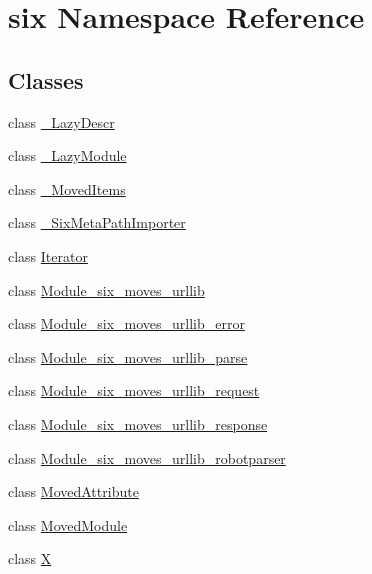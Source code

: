 \hypertarget{namespacesix}{}\section{six Namespace Reference}
\label{namespacesix}
\subsection*{Classes}
\begin{DoxyCompactItemize}
\item 
class \hyperlink{classsix_1_1__LazyDescr}{\+\_\+\+Lazy\+Descr}
\item 
class \hyperlink{classsix_1_1__LazyModule}{\+\_\+\+Lazy\+Module}
\item 
class \hyperlink{classsix_1_1__MovedItems}{\+\_\+\+Moved\+Items}
\item 
class \hyperlink{classsix_1_1__SixMetaPathImporter}{\+\_\+\+Six\+Meta\+Path\+Importer}
\item 
class \hyperlink{classsix_1_1Iterator}{Iterator}
\item 
class \hyperlink{classsix_1_1Module__six__moves__urllib}{Module\+\_\+six\+\_\+moves\+\_\+urllib}
\item 
class \hyperlink{classsix_1_1Module__six__moves__urllib__error}{Module\+\_\+six\+\_\+moves\+\_\+urllib\+\_\+error}
\item 
class \hyperlink{classsix_1_1Module__six__moves__urllib__parse}{Module\+\_\+six\+\_\+moves\+\_\+urllib\+\_\+parse}
\item 
class \hyperlink{classsix_1_1Module__six__moves__urllib__request}{Module\+\_\+six\+\_\+moves\+\_\+urllib\+\_\+request}
\item 
class \hyperlink{classsix_1_1Module__six__moves__urllib__response}{Module\+\_\+six\+\_\+moves\+\_\+urllib\+\_\+response}
\item 
class \hyperlink{classsix_1_1Module__six__moves__urllib__robotparser}{Module\+\_\+six\+\_\+moves\+\_\+urllib\+\_\+robotparser}
\item 
class \hyperlink{classsix_1_1MovedAttribute}{Moved\+Attribute}
\item 
class \hyperlink{classsix_1_1MovedModule}{Moved\+Module}
\item 
class \hyperlink{classsix_1_1X}{X}
\end{DoxyCompactItemize}
